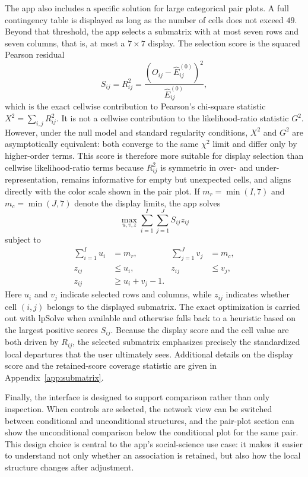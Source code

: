 \documentclass[11pt]{article}
\newcommand{\pkg}[1]{\textsf{#1}}
\begin{document}
The app also includes a specific solution for large categorical pair
plots. A full contingency table is displayed as long as the number of cells does
not exceed $49$. Beyond that threshold, the app selects a submatrix with at
most seven rows and seven columns, that is, at most a $7 \times 7$ display.
The selection score is the squared Pearson
residual
\begin{equation}
S_{ij} = R_{ij}^2
=
\frac{\left(O_{ij} - \widehat{E}^{(0)}_{ij}\right)^2}
     {\widehat{E}^{(0)}_{ij}},
\label{eq:score}
\end{equation}
which is the exact cellwise contribution to Pearson's chi-square statistic
$X^2 = \sum_{i,j} R_{ij}^2$. It is not a cellwise contribution to the
likelihood-ratio statistic $G^2$. However, under the null model and standard
regularity conditions, $X^2$ and $G^2$ are asymptotically equivalent: both
converge to the same $\chi^2$ limit and differ only by higher-order terms.
This score is therefore more suitable for display selection than cellwise
likelihood-ratio terms because $R_{ij}^2$ is symmetric in over- and
under-representation, remains informative for empty but unexpected cells, and
aligns directly with the color scale shown in the pair plot. If
$m_r = \min(I,7)$ and $m_c = \min(J,7)$ denote the display limits, the app
solves
\begin{equation*}
\max_{u,v,z}\sum_{i=1}^{I}\sum_{j=1}^{J} S_{ij} z_{ij}
\end{equation*}
subject to
\begin{align*}
\sum_{i=1}^{I} u_i &= m_r,
&
\sum_{j=1}^{J} v_j &= m_c,
\\
z_{ij} &\le u_i,
&
z_{ij} &\le v_j,
\\
z_{ij} &\ge u_i + v_j - 1.
\end{align*}
Here $u_i$ and $v_j$ indicate selected rows and columns, while $z_{ij}$
indicates whether cell $(i,j)$ belongs to the displayed submatrix. The exact
optimization is carried out with \pkg{lpSolve} \citep{lpSolve} when available
and otherwise falls back to a heuristic based on the largest positive scores
$S_{ij}$. Because the display score and the cell value are both driven by
$R_{ij}$, the selected submatrix emphasizes precisely the standardized local
departures that the user ultimately sees. Additional details on the display
score and the retained-score coverage statistic are given in
Appendix~\ref{app:submatrix}.

Finally, the interface is designed to support comparison rather than only
inspection. When controls are selected, the network view can be switched
between conditional and unconditional structures, and the pair-plot section can
show the unconditional comparison below the conditional plot for the same pair.
This design choice is central to the app's social-science use case: it makes it
easier to understand not only whether an association is retained, but also how
the local structure changes after adjustment.
\end{document}
